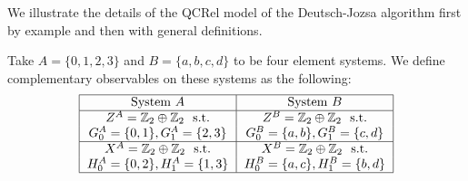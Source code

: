 We illustrate the details of the QCRel model of the Deutsch-Jozsa algorithm first by example and then with general definitions.

\begin{example}
Take $A=\{0,1,2,3\}$ and $B=\{a,b,c,d\}$ to be four element systems. We define complementary observables on these systems as the following:
\begin{align*}
\begin{tabular}{|c|c|}\hline
System $A$ & System $B$ \\\hline
$Z^A = \mathbb{Z}_2\oplus\mathbb{Z}_2 \mbox{~~s.t.}$ & $Z^B = \mathbb{Z}_2\oplus\mathbb{Z}_2\mbox{~~s.t.}$ \\
$G_0^A=\{0,1\},G_1^A=\{2,3\}$ & $G_0^B=\{a,b\},G_1^B=\{c,d\}$ \\ \hline
$X^A = \mathbb{Z}_2\oplus\mathbb{Z}_2 \mbox{~~s.t.}$ & $X^B = \mathbb{Z}_2\oplus\mathbb{Z}_2\mbox{~~s.t.}$ \\
$H_0^A=\{0,2\},H_1^A=\{1,3\}$ & $H_0^B=\{a,c\},H_1^B=\{b,d\}$ \\ \hline
\end{tabular}
\end{align*}



\end{example}
